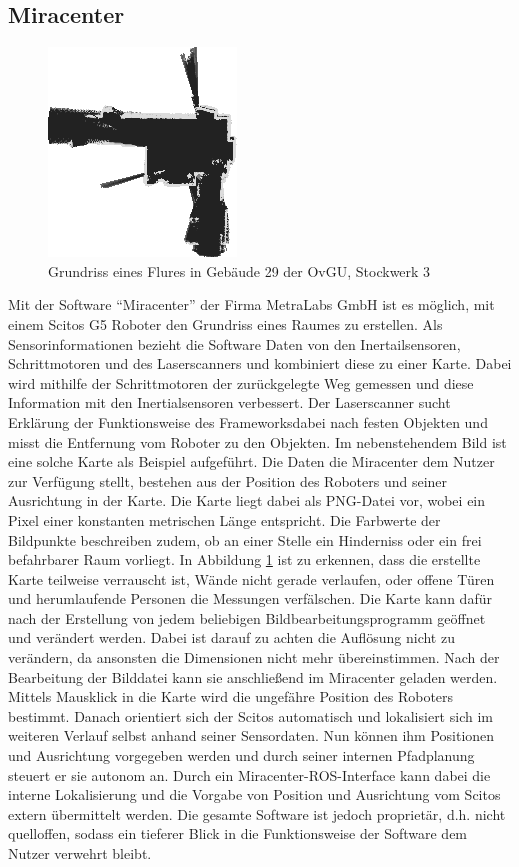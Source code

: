 \subsection{Miracenter}
\begin{figure}
\centering
\includegraphics[scale=0.9]{Bilder/Flur}
\caption{Grundriss eines Flures in Gebäude 29 der OvGU, Stockwerk 3}
\label{fig:Flur}
\end{figure}
Mit der Software "`Miracenter"' der Firma MetraLabs GmbH ist es möglich, mit einem Scitos G5 Roboter den Grundriss eines Raumes zu erstellen. Als Sensorinformationen bezieht die Software Daten von den Inertailsensoren, Schrittmotoren und des Laserscanners und kombiniert diese zu einer Karte. Dabei wird mithilfe der Schrittmotoren der zurückgelegte Weg gemessen und diese Information mit den Inertialsensoren verbessert. Der Laserscanner sucht Erklärung der Funktionsweise des Frameworksdabei nach festen Objekten und misst die Entfernung vom Roboter zu den Objekten. Im nebenstehendem Bild ist eine solche Karte als Beispiel aufgeführt. Die Daten die Miracenter dem Nutzer zur Verfügung stellt, bestehen aus der Position des Roboters und seiner Ausrichtung in der Karte. Die Karte liegt dabei als PNG-Datei vor, wobei ein Pixel einer konstanten metrischen Länge entspricht. Die Farbwerte der Bildpunkte beschreiben zudem, ob an einer Stelle ein Hinderniss oder ein frei befahrbarer Raum vorliegt. In Abbildung \ref{fig:Flur} ist zu erkennen, dass die erstellte Karte teilweise verrauscht ist, Wände nicht gerade verlaufen, oder offene Türen und herumlaufende Personen die Messungen verfälschen. Die Karte kann dafür nach der Erstellung von jedem beliebigen Bildbearbeitungsprogramm geöffnet und verändert werden. Dabei ist darauf zu achten die Auflösung nicht zu verändern, da ansonsten die Dimensionen nicht mehr übereinstimmen. Nach der Bearbeitung der Bilddatei kann sie anschließend im Miracenter geladen werden. Mittels Mausklick in die Karte wird die ungefähre Position des Roboters bestimmt. Danach orientiert sich der Scitos automatisch und lokalisiert sich im weiteren Verlauf selbst anhand seiner Sensordaten. Nun können ihm Positionen und Ausrichtung vorgegeben werden und durch seiner internen Pfadplanung steuert er sie autonom an. Durch ein Miracenter-ROS-Interface kann dabei die interne Lokalisierung und die Vorgabe von Position und Ausrichtung vom Scitos extern übermittelt werden. Die gesamte Software ist jedoch proprietär, d.h. nicht quelloffen, sodass ein tieferer Blick in die Funktionsweise der Software dem Nutzer verwehrt bleibt.
